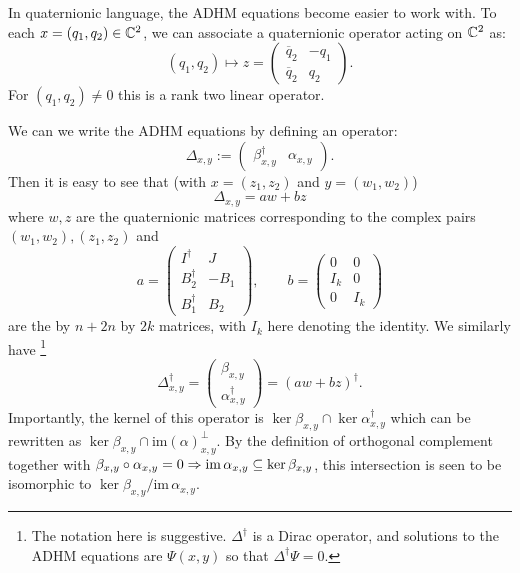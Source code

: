 	In quaternionic language, the ADHM equations become easier to work with. To each $x = (q_1, q_2) \in \mathbb{C}^2$, we can associate a quaternionic operator acting on $\mathbb{C}^2$ as:
	\begin{equation}
		(q_1, q_2) \mapsto z = \begin{pmatrix}
			\overline q_2 & -q_1\\
			\overline q_2 & q_2
		\end{pmatrix}.
	\end{equation}
	For $(q_1, q_2) \neq 0$ this is a rank two linear operator.
	
	We can we write the ADHM equations by defining an operator:
	\begin{equation}
		\Delta_{x,y} := \begin{pmatrix}
			\beta^\dagger_{x,y} & \alpha_{x,y}
		\end{pmatrix}.
	\end{equation}
	Then it is easy to see that (with $x=(z_1, z_2)$ and $y=(w_1, w_2)$)
	\begin{equation}
		\Delta_{x, y} = a w + b z
	\end{equation}
	where $w, z$ are the quaternionic matrices corresponding to the complex pairs $(w_1, w_2), (z_1, z_2)$ and 
	\begin{equation}
		a = \begin{pmatrix}
			I^\dagger & J\\
			B_2^\dagger & -B_1\\
			B_1^\dagger & B_2
		\end{pmatrix}, \qquad b = \begin{pmatrix}
			0 & 0\\
			I_k & 0\\
			0 & I_k
		\end{pmatrix}
	\end{equation}
	are the by $n+ 2n$ by $2k$ matrices, with $I_k$ here denoting the identity. We similarly have \footnote{The notation here is suggestive. $\Delta^\dagger$ is a Dirac operator, and solutions to the ADHM equations are $\Psi(x,y)$ so that $\Delta^\dagger \Psi = 0$.}
	\begin{equation}
		\Delta^\dagger_{x,y} = \begin{pmatrix}
			\beta_{x,y}\\
			\alpha^\dagger_{x,y}
		\end{pmatrix} =
		(a w  + b z)^\dagger.
	\end{equation}
	Importantly, the kernel of this operator is $\ker \beta_{x,y} \cap \ker \alpha^\dagger_{x,y}$ which can be rewritten as $\ker \beta_{x,y} \cap \mathrm{im}(\alpha)^\perp_{x,y}$. By the definition of orthogonal complement together with $\beta_{x,y} \circ \alpha_{x,y} = 0 \Rightarrow \mathrm{im}\, \alpha_{x,y} \subseteq \ker \beta_{x,y}$, this intersection is seen to be isomorphic to $\ker \beta_{x,y} / \mathrm{im}\, \alpha_{x,y}$.
	
